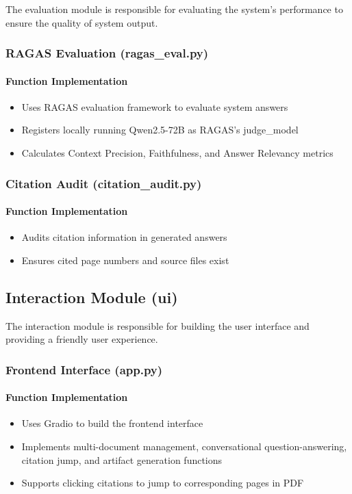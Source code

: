 The evaluation module is responsible for evaluating the system's performance to
ensure the quality of system output.

\subsubsection{RAGAS Evaluation (ragas\_eval.py)}

\paragraph{Function Implementation}
\begin{itemize}
    \item Uses RAGAS evaluation framework to evaluate system answers
    \item Registers locally running Qwen2.5-72B as RAGAS's judge\_model
    \item Calculates Context Precision, Faithfulness, and Answer Relevancy metrics
\end{itemize}

\subsubsection{Citation Audit (citation\_audit.py)}

\paragraph{Function Implementation}
\begin{itemize}
    \item Audits citation information in generated answers
    \item Ensures cited page numbers and source files exist
\end{itemize}

\subsection{Interaction Module (ui)}

The interaction module is responsible for building the user interface and
providing a friendly user experience.

\subsubsection{Frontend Interface (app.py)}

\paragraph{Function Implementation}
\begin{itemize}
    \item Uses Gradio to build the frontend interface
    \item Implements multi-document management, conversational question-answering,
          citation jump, and artifact generation functions
    \item Supports clicking citations to jump to corresponding pages in PDF
\end{itemize}
